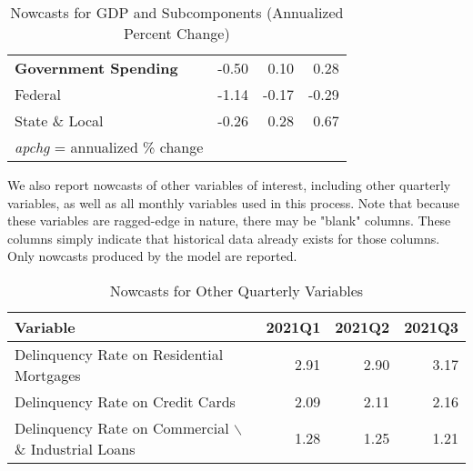 \documentclass[11pt, letterpaper]{article}\usepackage[]{graphicx}\usepackage[]{color}
\begin{document}
\begin{table}[H]
\begin{tabular}{lrrr}
  \hspace{0mm} \textbf{Government Spending} & -0.50 & 0.10 & 0.28 \\ 
  \hspace{8mm}  Federal & -1.14 & -0.17 & -0.29 \\ 
  \hspace{8mm}  State \& Local & -0.26 & 0.28 & 0.67 \\ 
   \hline 
 \textit{apchg} = annualized \% change 
\end{tabular}
\endgroup
\caption{Nowcasts for GDP and Subcomponents (Annualized Percent Change)} 
\end{table}


We also report nowcasts of other variables of interest, including other quarterly variables, as well as all monthly variables used in this process. Note that because these variables are ragged-edge in nature, there may be "blank" columns. These columns simply indicate that historical data already exists for those columns. Only nowcasts produced by the model are reported.
\begin{table}[H]
\centering
\begingroup\fontsize{11pt}{13pt}\selectfont
\begin{tabular}{lrrr}
  \hline
Variable & 2021Q1 & 2021Q2 & 2021Q3 \\ 
  \hline
Delinquency Rate on Residential Mortgages & 2.91 & 2.90 & 3.17 \\ 
  Delinquency Rate on Credit Cards & 2.09 & 2.11 & 2.16 \\ 
  Delinquency Rate on Commercial $\backslash$\& Industrial Loans & 1.28 & 1.25 & 1.21 \\ 
   \hline
\end{tabular}
\endgroup
\caption{Nowcasts for Other Quarterly Variables} 
\end{table}
\end{document}
